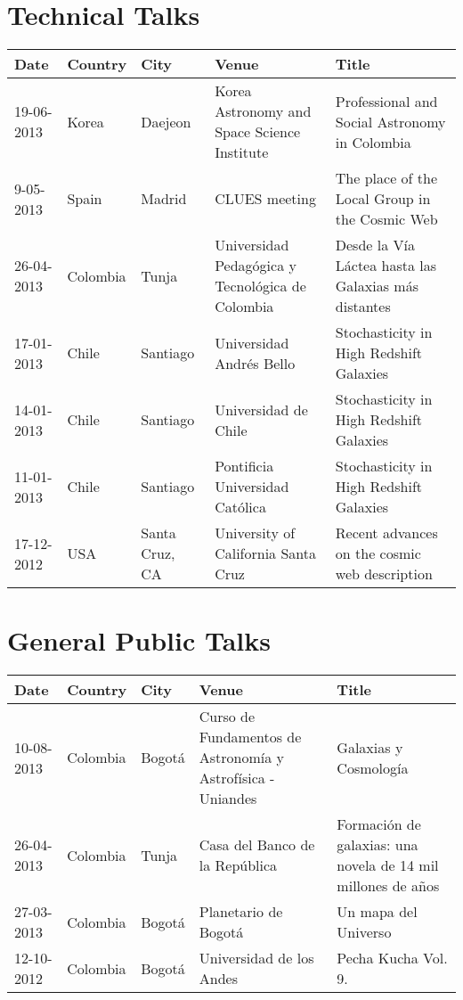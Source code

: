 \documentclass{report}
\begin{document}
\section*{Technical Talks}

\begin{tabular}{p{2.0cm} p{1.5cm} p{1.5cm} p{2cm} p{5cm}}\hline
Date & Country & City& Venue & Title\\\hline
19-06-2013 & Korea & Daejeon & Korea Astronomy and Space Science Institute & Professional and Social Astronomy in Colombia\\
9-05-2013 & Spain & Madrid & CLUES meeting & The place of the Local Group in the Cosmic Web\\
26-04-2013 & Colombia & Tunja & Universidad Pedag\'ogica y
Tecnol\'ogica de Colombia & Desde la V\'ia L\'actea hasta las Galaxias
m\'as distantes\\
17-01-2013 & Chile & Santiago  & Universidad Andr\'es Bello &
Stochasticity in High Redshift Galaxies\\
14-01-2013 & Chile & Santiago  & Universidad de Chile&
Stochasticity in High Redshift Galaxies\\
11-01-2013 & Chile & Santiago  & Pontificia Universidad Cat\'olica&
Stochasticity in High Redshift Galaxies\\
17-12-2012 & USA & Santa Cruz, CA & University of California Santa
Cruz & Recent advances on the cosmic web description  
\end{tabular}


\section*{General Public Talks}


\begin{tabular}{p{2.0cm} p{1.5cm} p{1.5cm} p{2cm} p{5cm}}\hline
Date & Country & City& Venue& Title\\\hline
10-08-2013 & Colombia & Bogot\'a & Curso de Fundamentos de Astronom\'ia y Astrof\'isica - Uniandes &
Galaxias y Cosmolog\'ia\\
26-04-2013 & Colombia & Tunja & Casa del Banco de la Rep\'ublica &
Formaci\'on de galaxias: una novela de 14 mil millones de a\~nos\\  
27-03-2013 & Colombia & Bogot\'a & Planetario de Bogot\'a & Un mapa del
Universo\\
12-10-2012 & Colombia & Bogot\'a & Universidad de los Andes & Pecha
Kucha Vol. 9.
\end{tabular}
\end{document}
